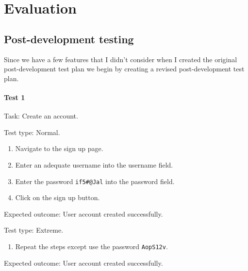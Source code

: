 \pagestyle{fancy} 
\chead{\mdseries \thepage}

\chapter{Evaluation}
\label{chap:evaluation}

\section{Post-development testing}

Since we have a few features that I didn't consider when I created the original post-development test plan we begin
by creating a revised post-development test plan.

\subsubsection{Test 1}

{\sffamily Task:} Create an account.\\

{\color{gray} \hrulefill}

{\sffamily Test type: Normal.}

\begin{enumerate}
  \item Navigate to the sign up page.
  \item Enter an adequate username into the username field.
  \item Enter the password \texttt{if5\#@Jal} into the password field.
  \item Click on the sign up button.
\end{enumerate}

{\sffamily Expected outcome:} User account created successfully. \\

{\color{gray} \hrulefill}

{\sffamily Test type: Extreme.}\\

\begin{enumerate}
\item Repeat the steps except use the password \texttt{AopS12v}.\\
\end{enumerate}

{\sffamily Expected outcome:} User account created successfully.\\

